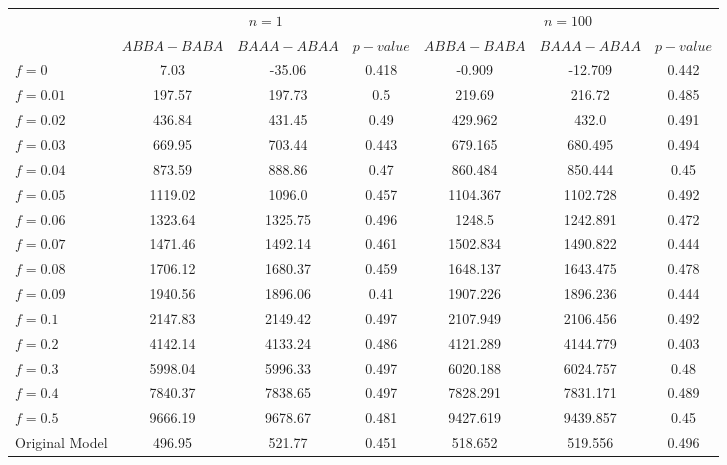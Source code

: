 \begin{tabular}{@{}lcccccc@{}}
\toprule
 & \multicolumn{3}{c}{$n=1$} & \multicolumn{3}{c}{$n=100$} \\
\cmidrule(lr){2-4} \cmidrule(lr){5-7}
 & $ABBA-BABA$ & $BAAA-ABAA$ & $p-value$ & $ABBA-BABA$ & $BAAA-ABAA$ & $p-value$ \\
\midrule
$f = 0$ & 7.03 & -35.06 & 0.418 & -0.909 & -12.709 & 0.442 \\
$f = 0.01$ & 197.57 & 197.73 & 0.5 & 219.69 & 216.72 & 0.485 \\
$f = 0.02$ & 436.84 & 431.45 & 0.49 & 429.962 & 432.0 & 0.491 \\
$f = 0.03$ & 669.95 & 703.44 & 0.443 & 679.165 & 680.495 & 0.494 \\
$f = 0.04$ & 873.59 & 888.86 & 0.47 & 860.484 & 850.444 & 0.45 \\
$f = 0.05$ & 1119.02 & 1096.0 & 0.457 & 1104.367 & 1102.728 & 0.492 \\
$f = 0.06$ & 1323.64 & 1325.75 & 0.496 & 1248.5 & 1242.891 & 0.472 \\
$f = 0.07$ & 1471.46 & 1492.14 & 0.461 & 1502.834 & 1490.822 & 0.444 \\
$f = 0.08$ & 1706.12 & 1680.37 & 0.459 & 1648.137 & 1643.475 & 0.478 \\
$f = 0.09$ & 1940.56 & 1896.06 & 0.41 & 1907.226 & 1896.236 & 0.444 \\
$f = 0.1$ & 2147.83 & 2149.42 & 0.497 & 2107.949 & 2106.456 & 0.492 \\
$f = 0.2$ & 4142.14 & 4133.24 & 0.486 & 4121.289 & 4144.779 & 0.403 \\
$f = 0.3$ & 5998.04 & 5996.33 & 0.497 & 6020.188 & 6024.757 & 0.48 \\
$f = 0.4$ & 7840.37 & 7838.65 & 0.497 & 7828.291 & 7831.171 & 0.489 \\
$f = 0.5$ & 9666.19 & 9678.67 & 0.481 & 9427.619 & 9439.857 & 0.45 \\
Original Model & 496.95 & 521.77 & 0.451 & 518.652 & 519.556 & 0.496 \\
\bottomrule
\end{tabular}
